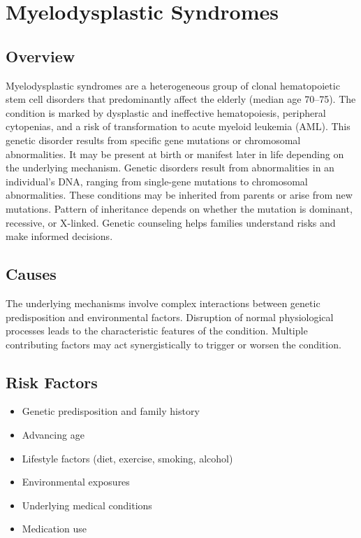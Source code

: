 \chapter{Myelodysplastic Syndromes}
\label{sec:Myelodysplastic Syndromes}

\section{Overview}
Myelodysplastic syndromes are a heterogeneous group of clonal hematopoietic stem cell disorders that predominantly affect the elderly (median age 70--75). The condition is marked by dysplastic and ineffective hematopoiesis, peripheral cytopenias, and a risk of transformation to acute myeloid leukemia (AML). This genetic disorder results from specific gene mutations or chromosomal abnormalities. It may be present at birth or manifest later in life depending on the underlying mechanism. Genetic disorders result from abnormalities in an individual's DNA, ranging from single-gene mutations to chromosomal abnormalities. These conditions may be inherited from parents or arise from new mutations. Pattern of inheritance depends on whether the mutation is dominant, recessive, or X-linked. Genetic counseling helps families understand risks and make informed decisions.
\section{Causes}
The underlying mechanisms involve complex interactions between genetic predisposition and environmental factors. Disruption of normal physiological processes leads to the characteristic features of the condition. Multiple contributing factors may act synergistically to trigger or worsen the condition.
\section{Risk Factors}


\begin{itemize}[noitemsep]
  \item Genetic predisposition and family history
  \item Advancing age
  \item Lifestyle factors (diet, exercise, smoking, alcohol)
  \item Environmental exposures
  \item Underlying medical conditions
  \item Medication use
\end{itemize}
